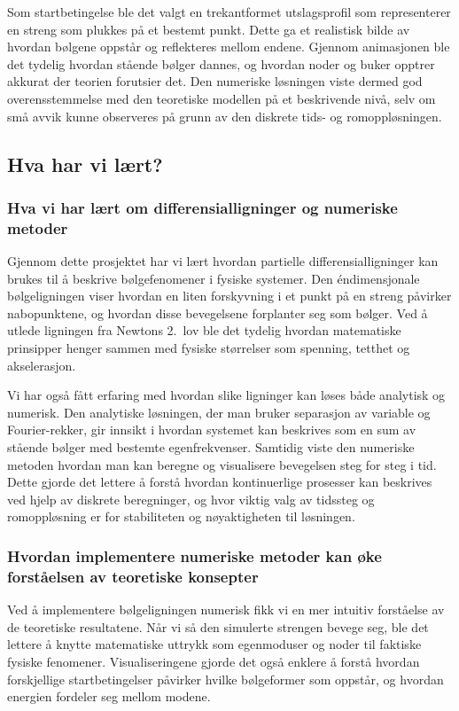 Som startbetingelse ble det valgt en trekantformet utslagsprofil som representerer en streng som plukkes på et bestemt punkt. Dette ga et realistisk bilde av hvordan bølgene oppstår og reflekteres mellom endene. Gjennom animasjonen ble det tydelig hvordan stående bølger dannes, og hvordan noder og buker opptrer akkurat der teorien forutsier det. Den numeriske løsningen viste dermed god overensstemmelse med den teoretiske modellen på et beskrivende nivå, selv om små avvik kunne observeres på grunn av den diskrete tids- og romoppløsningen.

\subsection{Hva har vi lært?}
\subsubsection{Hva vi har lært om differensialligninger og numeriske metoder}

Gjennom dette prosjektet har vi lært hvordan partielle differensialligninger kan brukes til å beskrive bølgefenomener i fysiske systemer. Den éndimensjonale bølgeligningen viser hvordan en liten forskyvning i et punkt på en streng påvirker nabopunktene, og hvordan disse bevegelsene forplanter seg som bølger. Ved å utlede ligningen fra Newtons 2.~lov ble det tydelig hvordan matematiske prinsipper henger sammen med fysiske størrelser som spenning, tetthet og akselerasjon. 

Vi har også fått erfaring med hvordan slike ligninger kan løses både analytisk og numerisk. Den analytiske løsningen, der man bruker separasjon av variable og Fourier-rekker, gir innsikt i hvordan systemet kan beskrives som en sum av stående bølger med bestemte egenfrekvenser. Samtidig viste den numeriske metoden hvordan man kan beregne og visualisere bevegelsen steg for steg i tid. Dette gjorde det lettere å forstå hvordan kontinuerlige prosesser kan beskrives ved hjelp av diskrete beregninger, og hvor viktig valg av tidssteg og romoppløsning er for stabiliteten og nøyaktigheten til løsningen.

\subsubsection{Hvordan implementere numeriske metoder kan øke forståelsen av teoretiske konsepter}

Ved å implementere bølgeligningen numerisk fikk vi en mer intuitiv forståelse av de teoretiske resultatene. Når vi så den simulerte strengen bevege seg, ble det lettere å knytte matematiske uttrykk som egenmoduser og noder til faktiske fysiske fenomener. Visualiseringene gjorde det også enklere å forstå hvordan forskjellige startbetingelser påvirker hvilke bølgeformer som oppstår, og hvordan energien fordeler seg mellom modene. 

